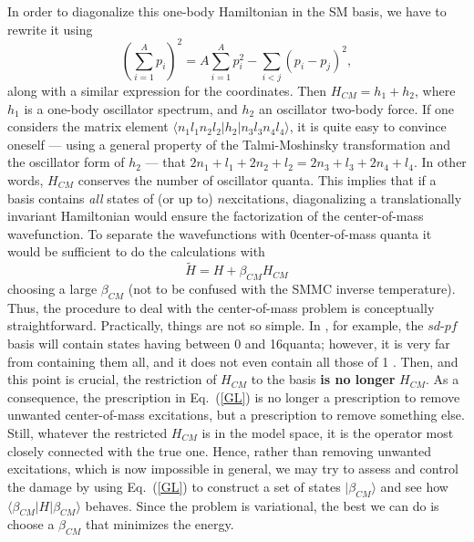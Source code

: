 \begin{multicols}{2}
In order to diagonalize this one-body Hamiltonian in the SM basis,
we have to rewrite it using
\begin{equation}
  \label{P2}
(\sum_{i=1}^A p_i)^2=A\sum_{i=1}^A p_i^2-\sum_{i<j}(p_i-p_j)^2,
\end{equation}
along with a similar expression for the coordinates. Then $H_{CM}=h_1+h_2$,
where $h_1$ is a one-body oscillator spectrum, and $h_2$ an oscillator
two-body force. If one considers the matrix element \mbox{$\langle
  n_1l_1n_2l_2|h_2| n_3l_3n_4l_4\rangle$}, it is quite easy to
convince oneself --- using a general property of the Talmi-Moshinsky
transformation and the oscillator form of $h_2$ --- that
\mbox{$2n_1+l_1+2n_2+l_2=2n_3+l_3+2n_4+l_4$}. In other words, $H_{CM}$
conserves the number of oscillator quanta. This implies that if a basis
contains {\em all} states of (or up to) $n$\hw excitations,
diagonalizing a translationally invariant Hamiltonian would ensure the
factorization of the center-of-mass wavefunction. To separate the
wavefunctions
with 0\hw center-of-mass quanta it would be sufficient to do the calculations
with
\begin{equation}
{\tilde H} = H + \beta_{CM} H_{CM}
\label{GL}
\end{equation}
choosing a large $\beta_{CM}$ (not to be confused with the SMMC
inverse temperature). Thus, the procedure to deal with the center-of-mass
problem is conceptually straightforward. Practically, things are not
so simple.  In , for example, the $sd$-$pf$ basis will contain
states having between 0 and 16\hw quanta; however, it is very far from
containing them all, and it does not even contain all those of 1 \hw.
Then, and this point is crucial, the restriction of
$H_{CM}$ to the basis {\bf is no longer} $H_{CM}$. As a consequence,
the prescription in Eq.~(\ref{GL}) is no longer a prescription to
remove unwanted center-of-mass excitations, but a prescription to remove
something else.  Still, whatever the restricted $H_{CM}$ is in the
model space, it is the operator most closely connected with the true
one. Hence, rather than removing unwanted excitations, which is now
impossible in general, we may try to assess and control the damage by
using Eq.~(\ref{GL}) to construct a set of states $|\beta_{CM}
\rangle$ and see how $\langle \beta_{CM}|H|\beta_{CM} \rangle$
behaves. Since the problem is variational, the best we can do is
choose a $\beta_{CM}$ that minimizes the energy.


\end{multicols}
